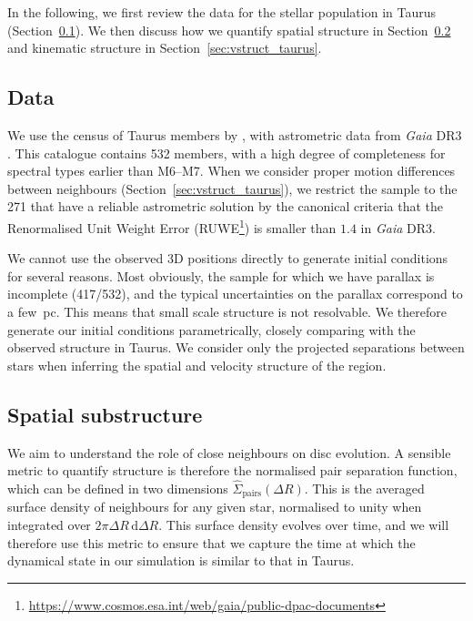 \documentclass{aa}
\begin{document}
In the following, we first review the data for the stellar population in Taurus (Section~\ref{sec:data}). We then discuss how we quantify spatial structure in Section~\ref{sec:spatial_struct} and kinematic structure in Section~\ref{sec:vstruct_taurus}.

\subsection{Data}
\label{sec:data}
We use the census of Taurus members by \citet{Luhman23}, with astrometric data from \textit{Gaia} DR3 \citep{Gaia16, Gaia23, Babuxiaux23}. This catalogue contains 532 members, with a high degree of completeness for spectral types earlier than M6–M7. {When we consider proper motion differences between neighbours (Section~\ref{sec:vstruct_taurus}),} we restrict the sample to the 271 that have a reliable astrometric solution by the canonical criteria that the Renormalised Unit Weight Error (RUWE\footnote{\url{https://www.cosmos.esa.int/web/gaia/public-dpac-documents}}) is smaller than $1.4$ in \textit{Gaia} DR3. 

We cannot use the observed 3D positions directly to generate initial conditions for several reasons. Most obviously, the sample for which we have parallax is incomplete (417/532), and the typical uncertainties on the parallax correspond to a few~pc. This means that small scale structure is not resolvable. We therefore generate our initial conditions parametrically, closely comparing with the observed structure in Taurus. We consider only the projected separations between stars when inferring the spatial and velocity structure of the region. 


\subsection{Spatial substructure}
\label{sec:spatial_struct}

We aim to understand the role of close neighbours on disc evolution. A sensible metric to quantify structure is therefore the normalised pair separation function, which can be defined in two dimensions $\hat{\Sigma}_\mathrm{pairs}(\Delta R)$. This is the averaged surface density of neighbours for any given star, normalised to unity when integrated over $2\pi \Delta R \, \mathrm{d}\Delta R$. This surface density evolves over time, and we will therefore use this metric to ensure that we capture the time at which the dynamical state in our simulation is similar to that in Taurus.
\end{document}
